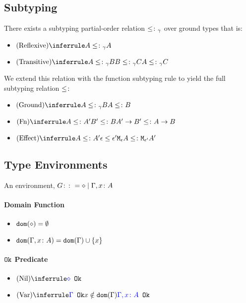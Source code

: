 \documentclass{report}
\begin{document}
\subsection{Subtyping}
    There exists a subtyping partial-order relation $\leq\colon_{\gamma}$ over ground types that is:
    \begin{itemize}
        \item $\ntreerulez{Reflexive}{A \subtype_{\ground} A}$
        \item $\ntreeruleII{Transitive}{A \subtype_{\ground} B }{ B \subtype_{\ground} C}{A \subtype_{\ground} C}$
    \end{itemize}

    We extend this relation with the function subtyping rule to yield the full subtyping relation $\leq\colon$

    \begin{itemize}
        \item $\ntreeruleI{Ground}{A \subtype_{\ground} B}{A \subtype B}$
        \item $\ntreeruleII{Fn}{A \subtype A' }{ B' \subtype B }{\fntype{A'}{B'} \subtype \ab}$
        \item $\ntreeruleII{Effect}{A\subtype A'}{\e\subeffect\e'}{\mea\subtype\M{\e'}{A'}}$
    \end{itemize}
\subsection{Type Environments}
An environment, $G \colon\colon= \diamond \mid \Gamma, x\colon A$ 
\paragraph{Domain Function}
\begin{itemize}
    \item $\texttt{dom}(\diamond) = \emptyset$
    \item $\texttt{dom}(\Gamma, x\colon A) =  \texttt{dom}(\Gamma)  \cup \left\{x \right\}$
\end{itemize}
\paragraph{$\texttt{Ok}$ Predicate}
\begin{itemize}
    \item $\ntreerulez{Nil}{\ok{\nil}}$
    \item $\ntreeruleII{Var}{\ok{\G} }{ x\notin \dom{\G}}{\ok{\gax}}$
\end{itemize}
\end{document}
